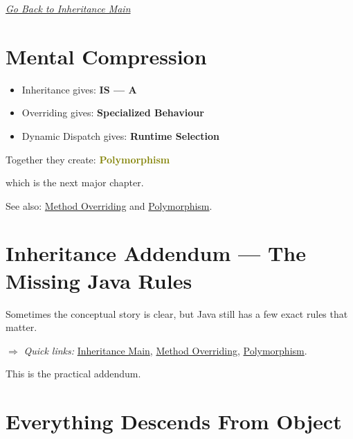\documentclass[11pt,a4paper]{book}
\begin{document}

\smallskip
\noindent
\hyperref[chap:inheritance]{\emph{Go Back to Inheritance Main}}


\section{Mental Compression}
\begin{itemize}
\item Inheritance gives: \textbf{IS --- A}
\item Overriding gives: \textbf{Specialized Behaviour}
\item Dynamic Dispatch gives: \textbf{Runtime Selection}
\end{itemize}
Together they create: \textcolor{olive}{\textbf{Polymorphism}}

which is the next major chapter.

See also: \hyperref[sec:method_overriding]{Method Overriding} and \hyperref[chap:polymorphism]{Polymorphism}.


\section{Inheritance Addendum --- The Missing Java Rules}\label{sec:inheritance_addendum}


Sometimes the conceptual story is clear,
but Java still has a few exact rules that matter.

\smallskip
\noindent
\textcolor{RosettaRoyalPurple}{$\Rightarrow$}
\emph{Quick links: }
\hyperref[chap:inheritance]{Inheritance Main},
\hyperref[sec:method_overriding]{Method Overriding},
\hyperref[chap:polymorphism]{Polymorphism}.


This is the practical addendum.


\section{Everything Descends From Object}
\end{document}
